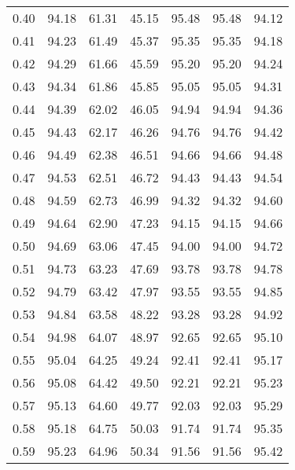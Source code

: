 \begin{tabular}{|c|c|c|c|c|c|c|}
      0.40 &     94.18 &     61.31 &      45.15 &   95.48 &      95.48 &         94.12 \\
      0.41 &     94.23 &     61.49 &      45.37 &   95.35 &      95.35 &         94.18 \\
      0.42 &     94.29 &     61.66 &      45.59 &   95.20 &      95.20 &         94.24 \\
      0.43 &     94.34 &     61.86 &      45.85 &   95.05 &      95.05 &         94.31 \\
      0.44 &     94.39 &     62.02 &      46.05 &   94.94 &      94.94 &         94.36 \\
      0.45 &     94.43 &     62.17 &      46.26 &   94.76 &      94.76 &         94.42 \\
      0.46 &     94.49 &     62.38 &      46.51 &   94.66 &      94.66 &         94.48 \\
      0.47 &     94.53 &     62.51 &      46.72 &   94.43 &      94.43 &         94.54 \\
      0.48 &     94.59 &     62.73 &      46.99 &   94.32 &      94.32 &         94.60 \\
      0.49 &     94.64 &     62.90 &      47.23 &   94.15 &      94.15 &         94.66 \\
      0.50 &     94.69 &     63.06 &      47.45 &   94.00 &      94.00 &         94.72 \\
      0.51 &     94.73 &     63.23 &      47.69 &   93.78 &      93.78 &         94.78 \\
      0.52 &     94.79 &     63.42 &      47.97 &   93.55 &      93.55 &         94.85 \\
      0.53 &     94.84 &     63.58 &      48.22 &   93.28 &      93.28 &         94.92 \\
      0.54 &     94.98 &     64.07 &      48.97 &   92.65 &      92.65 &         95.10 \\
      0.55 &     95.04 &     64.25 &      49.24 &   92.41 &      92.41 &         95.17 \\
      0.56 &     95.08 &     64.42 &      49.50 &   92.21 &      92.21 &         95.23 \\
      0.57 &     95.13 &     64.60 &      49.77 &   92.03 &      92.03 &         95.29 \\
      0.58 &     95.18 &     64.75 &      50.03 &   91.74 &      91.74 &         95.35 \\
      0.59 &     95.23 &     64.96 &      50.34 &   91.56 &      91.56 &         95.42 \\

\end{tabular}
